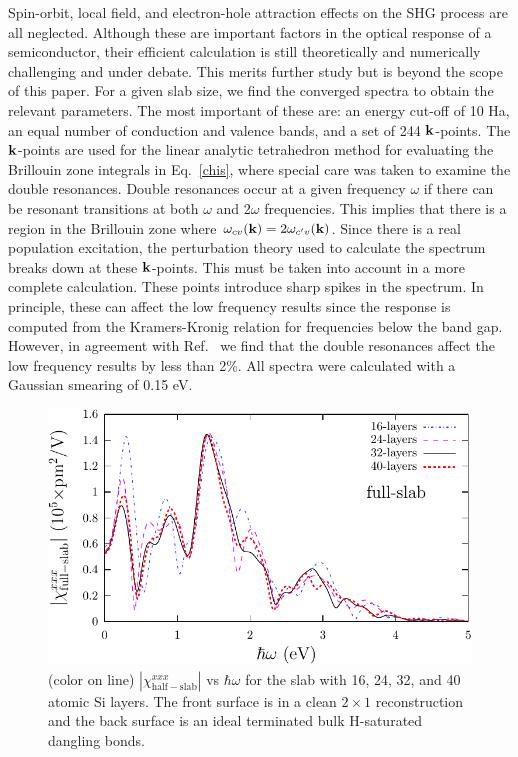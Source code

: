 \documentclass[floatfix,prb,aps,superscriptaddress,11pt,preprint,letterpaper]{revtex4}
\def\chon{black}
\begin{document}
{\color{\chon} Spin-orbit, local field, and electron-hole 
attraction\cite{leitsmannPRB05,trollePRB14} 
effects on the SHG process are all neglected.}
Although these are important factors in the optical response of a semiconductor,
{\color{\chon} their efficient calculation is still theoretically and  
  numerically challenging and  
under debate. This merits further study but is beyond the scope of this paper.} 
For a given {\color{\chon} slab size, we find the} converged spectra 
{\color{\chon} to obtain the relevant parameters. The most important of 
these are: an energy cut-off of 10 Ha, an equal number of conduction and 
valence bands, and a set of 244 $\mathbf{k}$-points.} 
{\color{\chon} The $\mathbf{k}$-points are used} for the linear analytic 
tetrahedron method {\color{\chon} for evaluating the}
Brillouin zone integrals in Eq.~\eqref{chis}, 
where special care was taken to examine the double resonances.\cite{nastosPRB05}
{\color{\chon}
Double resonances occur at a given frequency $\omega$ if there can be 
resonant transitions at both $\omega$ and 2$\omega$ frequencies. This 
implies that there is a region in the Brillouin zone where 
$\omega_{cv}(\mathbf{k})=2 \omega_{c'v}(\mathbf{k})$. Since there is a real population 
excitation, the perturbation theory used to calculate the spectrum breaks 
down at these $\mathbf{k}$-points. This must be taken into account in a more 
complete calculation. These points introduce sharp spikes in the spectrum. 
In principle, these can affect the low frequency results since the response 
is computed from the Kramers-Kronig relation for frequencies below the band 
gap. However, in agreement with Ref.~ we find that 
the double resonances affect the low frequency results by less than 2\%. 
All spectra were calculated with a Gaussian smearing of 0.15 eV.}
\begin{figure}
\centering 
\includegraphics[scale=.8]{plots/fig1}
\caption{(color on line) 
$|\chi_{\mathrm{half-slab}}^{xxx}|$ vs $\hbar\omega$ 
{\color{\chon} for the slab} 
with 16, 24, 32, and 40 atomic Si layers. The front surface 
{\color{\chon} is in a clean $2\times 1$ reconstruction and the back 
surface is an ideal terminated bulk H-saturated dangling bonds.}
\label{fig1}} 
\end{figure}
\end{document}
